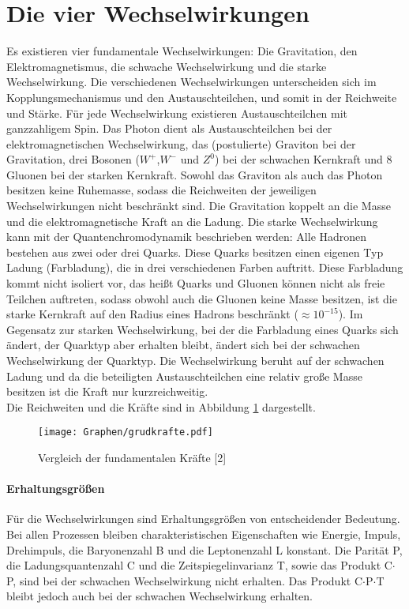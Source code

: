 \documentclass[twoside,colorback,accentcolor=tud4c,11pt]{tudreport}
\begin{document}
\section{Die vier Wechselwirkungen}
Es existieren vier fundamentale Wechselwirkungen: Die Gravitation, den Elektromagnetismus, die schwache Wechselwirkung und die starke Wechselwirkung. 
Die verschiedenen Wechselwirkungen unterscheiden sich im Kopplungsmechanismus und den Austauschteilchen, und somit in der Reichweite und Stärke. Für jede Wechselwirkung existieren Austauschteilchen mit ganzzahligem Spin. Das Photon dient als Austauschteilchen bei der elektromagnetischen Wechselwirkung, das (postulierte) Graviton bei der Gravitation, drei Bosonen ($W^+$,$W^-$ und $Z^0$) bei der schwachen Kernkraft und 8 Gluonen bei der starken Kernkraft. Sowohl das Graviton als auch das Photon besitzen keine Ruhemasse, sodass die Reichweiten der jeweiligen Wechselwirkungen nicht beschränkt sind. Die Gravitation koppelt an die Masse und die elektromagnetische Kraft an die Ladung. Die starke Wechselwirkung kann mit der Quantenchromodynamik beschrieben werden: Alle Hadronen bestehen aus zwei oder drei Quarks. Diese Quarks besitzen einen eigenen Typ Ladung (Farbladung), die in drei verschiedenen Farben auftritt. Diese Farbladung kommt nicht isoliert vor, das heißt Quarks und Gluonen können nicht als freie Teilchen auftreten, sodass obwohl auch die Gluonen keine Masse besitzen, ist die starke Kernkraft auf den Radius eines Hadrons beschränkt ($\approx 10^{-15}$). Im Gegensatz zur starken Wechselwirkung, bei der die Farbladung
eines Quarks sich ändert, der Quarktyp aber erhalten
bleibt, ändert sich bei der schwachen Wechselwirkung der
Quarktyp. Die Wechselwirkung beruht auf der schwachen Ladung und da die beteiligten Austauschteilchen eine relativ große Masse besitzen ist die Kraft nur kurzreichweitig. \\ Die Reichweiten und die Kräfte sind in Abbildung \ref{V_2.2} dargestellt.
\begin{figure}[H]
\centering
   	\begin{minipage}[b]{0.6\textwidth}
   	\texttt{[image: Graphen/grudkrafte.pdf]}
   	\caption{Vergleich der fundamentalen Kräfte [2]}
  	\label{V_2.2}
   	\end{minipage}
\end{figure}


\paragraph{Erhaltungsgrößen}
Für die Wechselwirkungen sind Erhaltungsgrößen von entscheidender Bedeutung. Bei allen Prozessen bleiben charakteristischen Eigenschaften wie Energie, Impuls, Drehimpuls, die Baryonenzahl B und die Leptonenzahl
L konstant. Die Parität P, die Ladungsquantenzahl C und die Zeitspiegelinvarianz T, sowie das Produkt C$\cdot$P, sind bei der schwachen Wechselwirkung nicht erhalten. Das Produkt C$\cdot$P$\cdot$T bleibt jedoch auch bei der schwachen Wechselwirkung erhalten.
\end{document}
